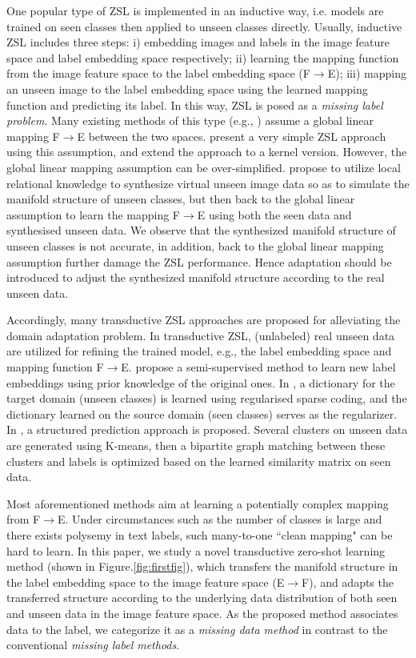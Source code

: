 \documentclass{article}
\begin{document}
One popular type of ZSL is implemented in an inductive way, i.e. models are trained on seen classes then applied to unseen classes directly. Usually, inductive ZSL includes three steps: i) embedding images and labels in the image feature space and label embedding space respectively; ii) learning the mapping function from the image feature space to the label embedding space (F$\rightarrow$E); iii) mapping an unseen image to the label embedding space using the learned mapping function and predicting its label. In this way, ZSL is posed as a {\em missing label problem}. Many existing methods of this type (e.g., \cite{socher2013zero}\cite{al2016recovering}\cite{qiao2016less}) assume a global linear mapping F$\rightarrow$E between the two spaces. \cite{romera2015embarrassingly} present a very simple ZSL approach using this assumption, and extend the approach to a kernel version. However, the global linear mapping assumption can be over-simplified. \cite{wang2016relational} propose to utilize local relational knowledge to synthesize virtual unseen image data so as to simulate the manifold structure of unseen classes, but then back to the global linear assumption to learn the mapping F$\rightarrow$E using both the seen data and synthesised unseen data. We observe that the synthesized manifold structure of unseen classes is not accurate, in addition, back to the global linear mapping assumption further damage the ZSL performance. Hence adaptation should be introduced to adjust the synthesized manifold structure according to the real unseen data.

Accordingly, many transductive ZSL approaches are proposed for alleviating the domain adaptation problem\cite{fu2015transductive}. In transductive ZSL, (unlabeled) real unseen data are utilized for refining the trained model, e.g., the label embedding space and mapping function F$\rightarrow$E. \cite{li2015semi} propose a semi-supervised method to learn new label embeddings using prior knowledge of the original ones. In \cite{kodirov2015unsupervised}, a dictionary for the target domain (unseen classes) is learned using regularised sparse coding, and the dictionary learned on the source domain (seen classes) serves as the regularizer. In \cite{zhang2016SPZSL}, a structured prediction approach is proposed. Several clusters on unseen data are generated using K-means, then a bipartite graph matching between these clusters and labels is optimized based on the learned similarity matrix on seen data.


Most aforementioned methods aim at learning a potentially complex mapping from F$\rightarrow$E. Under circumstances such as the number of classes is large and there exists polysemy in text labels, such many-to-one ``clean mapping" can be hard to learn. In this paper, we study a novel transductive zero-shot learning method (shown in Figure.\ref{fig:firstfig}), which transfers the manifold structure in the label embedding space to the image feature space (E$\rightarrow$F), and adapts the transferred structure according to the underlying data distribution of both seen and unseen data in the image feature space. As the proposed method associates data to the label, we categorize it as a {\em missing data method} in contrast to the conventional {\em missing label methods}.
\end{document}
